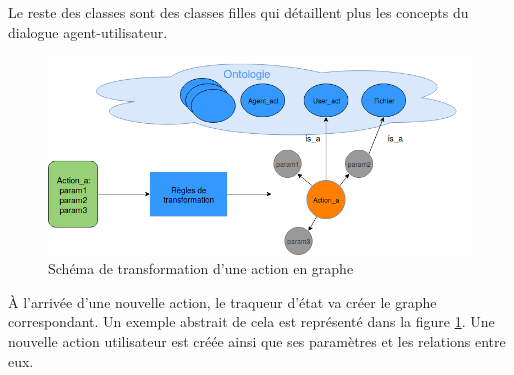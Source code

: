 Le reste des classes sont des classes filles qui détaillent plus les concepts du dialogue agent-utilisateur.
\begin{figure}
	\centering
	\includegraphics[width=0.88\linewidth]{images/Conception/DM/abstract_onto.png}
	\caption{Schéma de transformation d'une action en graphe}\label{abstract_onto}
	
\end{figure}
\par À l'arrivée d'une nouvelle action, le traqueur d'état va créer le graphe correspondant. Un exemple abstrait de cela est représenté dans la figure \ref{abstract_onto}. Une nouvelle action utilisateur est créée ainsi que ses paramètres et les relations entre eux.


